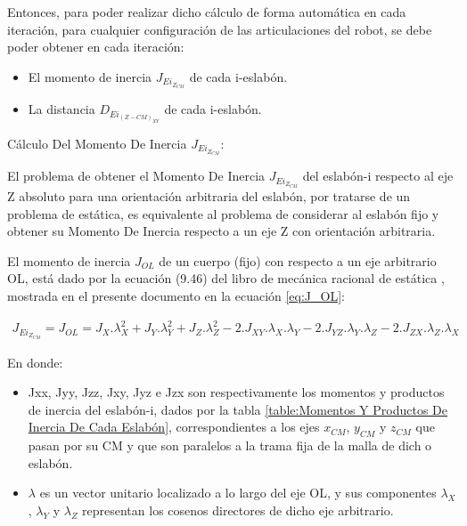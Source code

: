 \documentclass{article}
\begin{document}
\begin{sloppypar}
Entonces, para poder realizar dicho cálculo de forma automática en cada iteración, para cualquier configuración de las articulaciones del robot, se debe poder obtener en cada iteración:
\begin{itemize}
    \item El momento de inercia $J_{Ei_{Z_{CM}}}$ de cada i-eslabón.
    \item La distancia $D_{Ei_{(Z-CM)_{XY}}}$ de cada i-eslabón.
\end{itemize}


\hfill

Cálculo Del Momento De Inercia $J_{Ei_{Z_{CM}}}$:

\hfill

El problema de obtener el Momento De Inercia $J_{Ei_{Z_{CM}}}$ del eslabón-i respecto al eje Z absoluto para una orientación arbitraria del eslabón, por tratarse de un problema de estática, es equivalente al problema de considerar al eslabón fijo y obtener su Momento De Inercia respecto a un eje Z con orientación arbitraria.


El momento de inercia $J_{OL}$ de un cuerpo (fijo) con respecto a un eje arbitrario OL, está dado por la ecuación (9.46) del libro de mecánica racional de estática \cite{beermecanica}, mostrada en el presente documento en la ecuación \ref{eq:J_OL}:

\begin{align} \label{eq:J_OL}
    J_{Ei_{Z_{CM}}} = J_{OL} = J_X.\lambda_X^2+J_Y.\lambda_Y^2+J_Z.\lambda_Z^2-2.J_{XY}.\lambda_X.\lambda_Y-2.J_{YZ}.\lambda_Y.\lambda_Z-2.J_{ZX}.\lambda_Z.\lambda_X
\end{align}

En donde:
\begin{itemize}
    \item Jxx, Jyy, Jzz, Jxy, Jyz e Jzx son respectivamente los momentos y productos de inercia del eslabón-i, dados por la tabla \ref{table:Momentos Y Productos De Inercia De Cada Eslabón}, correspondientes a los ejes $x_{CM}$, $y_{CM}$ y $z_{CM}$ que pasan por su CM y que son paralelos a la trama fija de la malla de dich o eslabón.
    \item $\lambda$ es un vector unitario localizado a lo largo del eje OL, y sus componentes $\lambda_X$, $\lambda_Y$ y $\lambda_Z$ representan los cosenos directores de dicho eje arbitrario.
\end{itemize}


\end{sloppypar}
\end{document}
